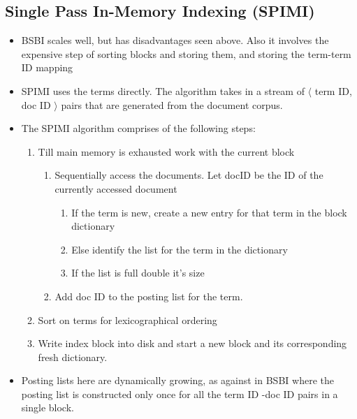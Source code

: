 \documentclass{article}
\begin{document}
\subsection{Single Pass In-Memory Indexing (SPIMI)}
\begin{itemize}
    \item BSBI scales well, but has disadvantages seen above. Also it involves the expensive step of sorting blocks and storing them, and storing the term-term ID mapping
    
    \item SPIMI uses the terms directly. The algorithm takes in a stream of $\langle$ term ID, doc ID $\rangle$ pairs that are generated from the document corpus. 
    
    \item The SPIMI algorithm comprises of the following steps:
    \begin{enumerate}
    
        \item Till main memory is exhausted work with the current block 
        \begin{enumerate}
            \item Sequentially access the documents. Let docID be the ID of the currently accessed document
                \begin{enumerate}
                    \item If the term is new, create a new entry for that term in the block dictionary
                    
                    \item Else identify the list for the term in the dictionary
                    
                    \item If the list is full double it's size
                \end{enumerate}
        \item Add doc ID to the posting list for the term.
        \end{enumerate}
        
        \item Sort on terms for lexicographical ordering
        
        \item Write index block into disk and start a new block and its corresponding fresh dictionary. 
    \end{enumerate}
    
    \item Posting lists here are dynamically growing, as against in BSBI where the posting list is constructed only once for all the term ID -doc ID pairs in a single block.
    

\end{itemize}
\end{document}
